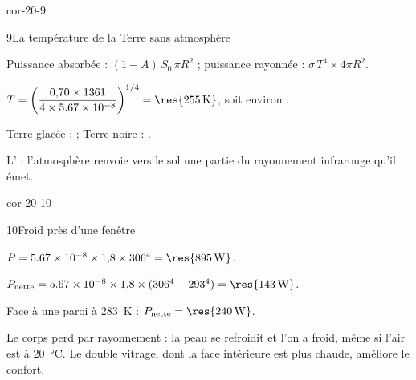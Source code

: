 \begin{blocLivre}{cor-20-9}
\begin{corrige}{9}{La température de la Terre sans atmosphère}
\begin{questions}
\item Puissance absorbée : $(1-A)\,S_0\,\pi R^2$ ; puissance rayonnée : $\sigma\,T^4\times4\pi R^2$.
\item $T=\left(\dfrac{0{,}70\times1361}{4\times\num{5.67e-8}}\right)^{1/4}=\res{\qty{255}{K}}$, soit environ .
\item Terre glacée :  ; Terre noire : .
\item L' : l'atmosphère renvoie vers le sol une partie du rayonnement infrarouge qu'il émet.
\end{questions}
\end{corrige}
\end{blocLivre}
\begin{blocLivre}{cor-20-10}
\begin{corrige}{10}{Froid près d'une fenêtre}
\begin{questions}
\item $P=\num{5.67e-8}\times1{,}8\times306^4=\res{\qty{895}{W}}$.
\item $P_\mathrm{nette}=\num{5.67e-8}\times1{,}8\times(306^4-293^4)=\res{\qty{143}{W}}$.
\item Face à une paroi à \qty{283}{K} : $P_\mathrm{nette}=\res{\qty{240}{W}}$.
\item Le corps perd par rayonnement  : la peau se refroidit et l'on a froid, même si l'air
est à \qty{20}{\degreeCelsius}. Le double vitrage, dont la face intérieure est plus chaude, améliore le confort.
\end{questions}
\end{corrige}
\end{blocLivre}
